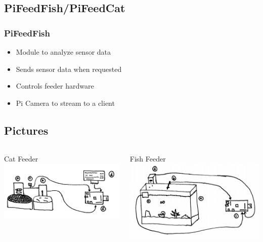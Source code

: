 \documentclass[]{beamer}
\begin{document}
\subsection{PiFeedFish/PiFeedCat}
\begin{frame}
	\frametitle{PiFeedFish}
    
    \begin{itemize}
    	\item Module to analyze sensor data
        \item Sends sensor data when requested
        \item Controls feeder hardware
        \item Pi Camera to stream to a client
    \end{itemize}
\end{frame}

\subsection{Pictures}
\begin{frame}
	\begin{columns}[T]
    	\begin{column}{.5\textwidth}
        	\begin{block}{Cat Feeder}
				\includegraphics[width=\textwidth]{Cat}
            \end{block}
        \end{column}
        
    	\begin{column}{.5\textwidth}
        	\begin{block}{Fish Feeder}
            	\includegraphics[width=\textwidth]{FishTank}
            \end{block}
        \end{column}
    \end{columns}
\end{frame}
\end{document}

